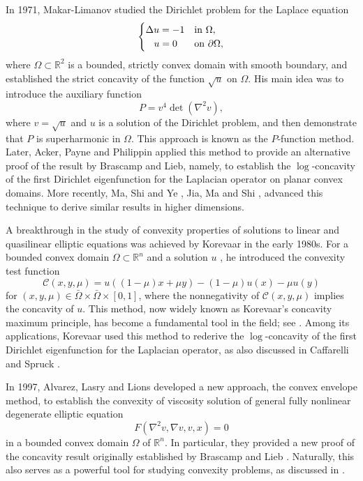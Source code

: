 \documentclass[11pt]{amsart}
\numberwithin{theorem}{section}
\numberwithin{equation}{section}
\begin{document}
In 1971, Makar-Limanov \cite{Makar-Limanov1971} studied the Dirichlet problem for the Laplace equation
\[\begin{cases}
 \Delta u=-1 & \mathrm{in}\ \Omega,\\
 \hspace{3mm}u=0 & \mathrm{on}\ \partial\Omega,
\end{cases}\]
where $\Omega\subset\mathbb{R}^2$ is a bounded, strictly convex domain with smooth boundary, and established the strict concavity of the function $\sqrt{u}$ on $\Omega$. His main idea was to introduce the auxiliary function
\[P=v^4\det(\nabla^2v),\]
where $v=\sqrt{u}$ and $u$ is a solution of the Dirichlet problem, and then demonstrate that $P$ is superharmonic in $\Omega$. This approach is known as the $P$-function method. Later, Acker, Payne and Philippin \cite{Acker-Payne-Philippin1981} applied this method to provide an alternative proof of the result by Brascamp and Lieb, namely, to establish the $\log$-concavity of the first Dirichlet eigenfunction for the Laplacian operator on planar convex domains. More recently, Ma, Shi and Ye \cite{Ma-Shi-Ye2012}, Jia, Ma and Shi \cite{Jia-Ma-Shi2023}, advanced this technique to derive similar results in higher dimensions.

A breakthrough in the study of convexity properties of solutions to linear and quasilinear elliptic equations was achieved by Korevaar \cite{Korevaar-1983,Korevaar1983} in the early 1980s. For a bounded convex domain $\Omega\subset\mathbb{R}^n$ and a solution $u$ , he introduced the convexity test function
\[\mathcal{C}(x,y,\mu)=u\left((1-\mu)x+\mu y\right)-(1-\mu)u(x)-\mu u(y)\]
for $(x,y,\mu)\in\bar{\Omega}\times\bar{\Omega}\times[0,1]$, where the nonnegativity of $\mathcal{C}(x,y,\mu)$ implies the concavity of $u$. This method, now widely known as Korevaar's concavity maximum principle, has become a fundamental tool in the field; see \cite{Kennington1985,Kawohl1986,Sakaguchi1987,Langford-Scheuer2021,Borrelli-Mosconi-Squassina2024,Mosconi-Riey-Squassina2024}. Among its applications, Korevaar \cite{Korevaar1983} used this method to rederive the $\log$-concavity of the first Dirichlet eigenfunction for the Laplacian operator, as also discussed in Caffarelli and Spruck \cite{Caffarelli-Spruck1982}.

In 1997, Alvarez, Lasry and Lions \cite{Alvarez-Lasry-Lions1997} developed a new approach, the convex envelope method, to establish the convexity of viscosity solution of general fully nonlinear degenerate elliptic equation
\[F(\nabla^2v,\nabla v,v,x)=0\]
in a bounded convex domain $\Omega$ of $\mathbb{R}^n$. In particular, they provided a new proof of the concavity result originally established by Brascamp and Lieb \cite{Brascamp-Lieb1976}. Naturally, this also serves as a powerful tool for studying convexity problems, as discussed in \cite{Bianchini-Salani2013,Crasta-Fragala2015,Ishige-Nakagawa-Salani2016}.
\end{document}
